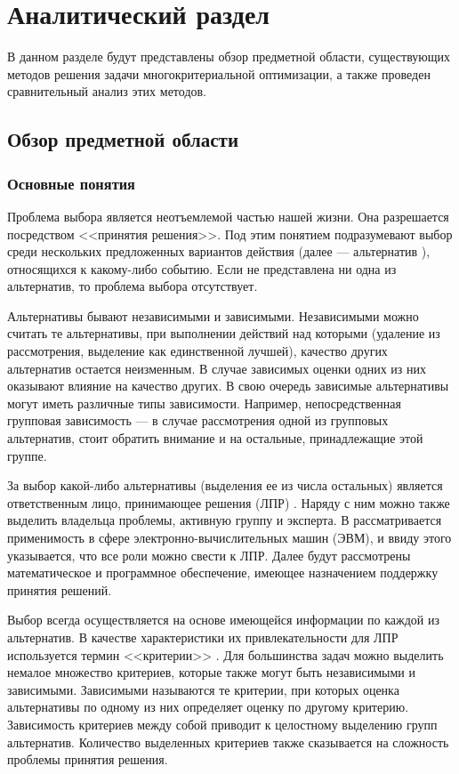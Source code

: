 \chapter{Аналитический раздел}

В данном разделе будут представлены обзор предметной области, существующих методов  решения задачи многокритериальной оптимизации, а также проведен сравнительный анализ этих методов.

\section{Обзор предметной области}

\subsection{Основные понятия}

Проблема выбора является неотъемлемой частью нашей жизни. Она разрешается посредством <<принятия решения>>. Под этим понятием подразумевают выбор среди нескольких предложенных вариантов действия (далее --- альтернатив \cite{Larychev}), относящихся к какому-либо событию. Если не представлена ни одна из альтернатив, то проблема выбора отсутствует.

Альтернативы бывают независимыми и зависимыми. Независимыми можно считать те альтернативы, при выполнении действий над которыми (удаление из рассмотрения, выделение как единственной лучшей), качество других альтернатив остается неизменным. В случае зависимых оценки одних из них оказывают влияние на качество других. В свою очередь зависимые альтернативы могут иметь различные типы зависимости. Например, непосредственная групповая зависимость --- в случае рассмотрения одной из групповых альтернатив, стоит обратить внимание и на остальные, принадлежащие этой группе.

За выбор какой-либо альтернативы (выделения ее из числа остальных) является ответственным лицо, принимающее решения (ЛПР) \cite{Larychev}. Наряду с ним можно также выделить владельца проблемы, активную группу и эксперта. В \cite{Larychev}
рассматривается применимость в сфере электронно-вычислительных машин (ЭВМ), и ввиду этого указывается, что все роли можно свести к ЛПР. Далее будут рассмотрены математическое и программное обеспечение, имеющее назначением поддержку принятия решений.

Выбор всегда осуществляется на основе имеющейся информации по каждой из альтернатив. В качестве характеристики их привлекательности для ЛПР используется термин <<критерии>> \cite{Larychev}. Для большинства задач можно выделить немалое множество критериев, которые также могут быть независимыми и зависимыми. Зависимыми называются те критерии, при которых оценка альтернативы по одному из них определяет оценку по другому критерию. Зависимость критериев между собой приводит к целостному выделению групп альтернатив. Количество выделенных критериев также сказывается на сложность проблемы принятия решения.

